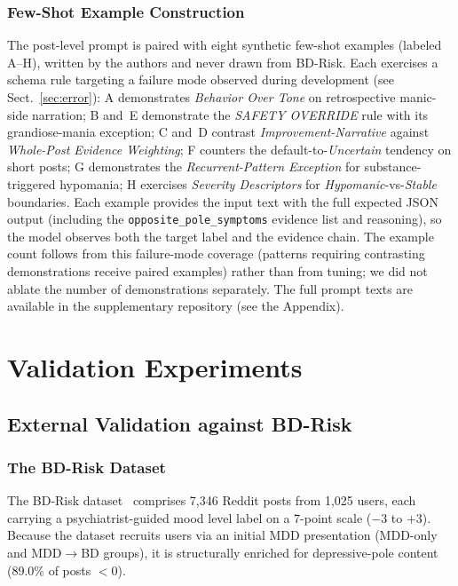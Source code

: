 \documentclass[runningheads]{llncs}
\begin{document}
\subsubsection{Few-Shot Example Construction}
The post-level prompt is paired with eight synthetic few-shot examples (labeled A--H), written by the authors and never drawn from BD-Risk. Each exercises a schema rule targeting a failure mode observed during development (see Sect.~\ref{sec:error}): A demonstrates \emph{Behavior Over Tone} on retrospective manic-side narration; B and~E demonstrate the \emph{SAFETY OVERRIDE} rule with its grandiose-mania exception; C and~D contrast \emph{Improvement-Narrative} against \emph{Whole-Post Evidence Weighting}; F counters the default-to-\emph{Uncertain} tendency on short posts; G demonstrates the \emph{Recurrent-Pattern Exception} for substance-triggered hypomania; H exercises \emph{Severity Descriptors} for \emph{Hypomanic}-vs-\emph{Stable} boundaries. Each example provides the input text with the full expected JSON output (including the \texttt{opposite\_pole\_symptoms} evidence list and reasoning), so the model observes both the target label and the evidence chain. The example count follows from this failure-mode coverage (patterns requiring contrasting demonstrations receive paired examples) rather than from tuning; we did not ablate the number of demonstrations separately. The full prompt texts are available in the supplementary repository (see the Appendix).

\section{Validation Experiments}

\subsection{External Validation against BD-Risk}
\label{sec:valid}

\subsubsection{The BD-Risk Dataset}
The BD-Risk dataset~\cite{lee2024detecting} comprises 7,346 Reddit posts from 1,025 users, each carrying a psychiatrist-guided mood level label on a 7-point scale ($-3$ to $+3$). Because the dataset recruits users via an initial MDD presentation (MDD-only and MDD$\rightarrow$BD groups), it is structurally enriched for depressive-pole content (89.0\% of posts $< 0$).
\end{document}
